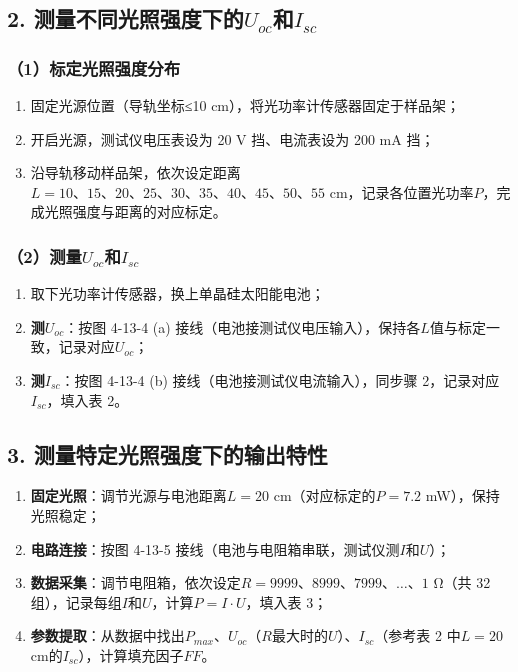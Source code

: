 \documentclass[12pt]{article}
\begin{document}
\subsection{2. 测量不同光照强度下的$U_{oc}$和$I_{sc}$}
\subsubsection{（1）标定光照强度分布}
\begin{enumerate}
  \item 固定光源位置（导轨坐标≤10 cm），将光功率计传感器固定于样品架；
  \item 开启光源，测试仪电压表设为 20 V 挡、电流表设为 200 mA 挡；
  \item 沿导轨移动样品架，依次设定距离$L=10、15、20、25、30、35、40、45、50、55$ cm，记录各位置光功率$P$，完成光照强度与距离的对应标定。
\end{enumerate}

\subsubsection{（2）测量$U_{oc}$和$I_{sc}$}
\begin{enumerate}
  \item 取下光功率计传感器，换上单晶硅太阳能电池；
  \item \textbf{测$U_{oc}$}：按图 4-13-4 (a) 接线（电池接测试仪电压输入），保持各$L$值与标定一致，记录对应$U_{oc}$；
  \item \textbf{测$I_{sc}$}：按图 4-13-4 (b) 接线（电池接测试仪电流输入），同步骤 2，记录对应$I_{sc}$，填入表 2。
\end{enumerate}

\subsection{3. 测量特定光照强度下的输出特性}
\begin{enumerate}
  \item \textbf{固定光照}：调节光源与电池距离$L=20$ cm（对应标定的$P=7.2$ mW），保持光照稳定；
  \item \textbf{电路连接}：按图 4-13-5 接线（电池与电阻箱串联，测试仪测$I$和$U$）；
  \item \textbf{数据采集}：调节电阻箱，依次设定$R=9999、8999、7999、\ldots、1$ Ω（共 32 组），记录每组$I$和$U$，计算$P=I \cdot U$，填入表 3；
  \item \textbf{参数提取}：从数据中找出$P_{max}$、$U_{oc}$（$R$最大时的$U$）、$I_{sc}$（参考表 2 中$L=20$ cm的$I_{sc}$），计算填充因子$FF$。
\end{enumerate}
\end{document}

